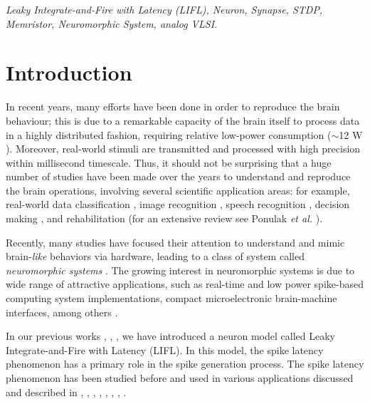 \documentclass[review]{elsarticle}
\begin{document}
\begin{frontmatter}
\begin{keyword}
\textit{Leaky Integrate-and-Fire with Latency (LIFL), Neuron, Synapse, STDP, Memristor, Neuromorphic System, analog VLSI.}
\end{keyword}


\end{frontmatter}


\section{Introduction}

In recent years, many efforts have been done in order to reproduce the brain behaviour; this is due to a remarkable capacity of the brain itself to process data in a highly distributed fashion, requiring relative low-power consumption ($\sim$12  W \cite{Sarpeshkar1998}). Moreover, real-world stimuli are transmitted and processed with high precision within millisecond timescale. Thus, it should not be surprising that a huge number of studies have been made over the years to understand and reproduce the brain operations, involving several scientific application areas: for example, real-world data classification \cite{BohteKok2002a, BohteKok2002b, Belatreche2003}, image recognition \cite{Thorpe2001, Guyonneau2004, Perrinet2004}, speech recognition \cite{Hopfield2000, Verstraeten2005, Gutig2009}, decision making \cite{Glackin2008}, and rehabilitation \cite{Rom2007} (for an extensive review see Ponulak \emph{et al.} \cite{Ponulak2011}). 

Recently, many studies have focused their attention to understand and mimic brain-\emph{like} behaviors via hardware, leading to a class of system called \emph{neuromorphic systems} \cite{Maed1989}. The growing interest in neuromorphic systems is due to wide  range of attractive applications, such as real-time and low power spike-based computing system implementations, compact microelectronic brain-machine interfaces, among others \cite{Indiveri2011}. 

In our previous works \cite{Salerno2011}, \cite{Cardarilli2013}, \cite{Cristini2015}, we have introduced a neuron model called Leaky Integrate-and-Fire with Latency (LIFL). In this model, the spike latency phenomenon has a primary role in the spike generation process. The spike latency phenomenon has been studied before and used in various applications discussed and described in \cite{FitzHugh1955}, \cite{Izhikevich2007}, \cite{Zheng2009}, \cite{Izhikevich2010}, \cite{Chen2011}, \cite{Yamani2012}, \cite{Gollisch1108}, \cite{Fontaine2009}. 
\end{document}
